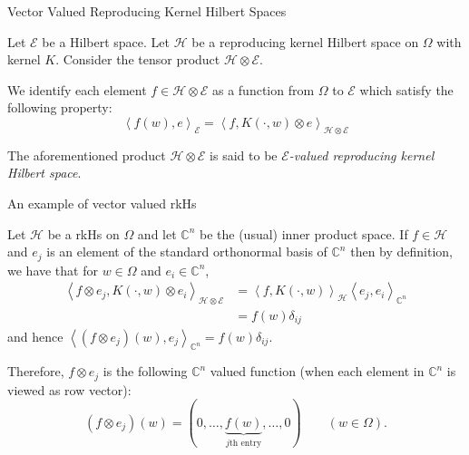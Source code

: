 \documentclass{beamer}
\newcommand{\C}{\mathbb C}
\newcommand{\calE}{{\mathcal E}}
\newcommand{\calH}{{\mathcal H}}
\newcommand{\ip}[1]{\left\langle #1 \right\rangle}
\begin{document}

\begin{frame}{Vector Valued Reproducing Kernel Hilbert Spaces}
\begin{definition}
Let $\calE$ be a Hilbert space. Let $\calH$ be a reproducing kernel Hilbert space on $\Omega$ with kernel $K$. Consider the tensor product $\calH \otimes \calE$.
\pause

We identify each element $f\in \calH \otimes \calE$ as a function from $\Omega$ to $\calE$ which satisfy the following property:
\begin{equation*}
\ip{f(w), e}_{\calE} = \ip{f, K(\cdot, w) \otimes e}_{\calH \otimes \calE}
\end{equation*}
\pause

The aforementioned product $\calH \otimes \calE$ is said to be \textit{$\calE$-valued reproducing kernel Hilbert space}.
\end{definition}

\end{frame}

\begin{frame}{An example of vector valued rkHs}

Let $\calH$ be a rkHs on $\Omega$ and let $\C ^{n}$ be the (usual) inner product space.
\pause
If $f \in \calH$ and $e_{j}$ is an element of the standard orthonormal basis of $\C^{n}$ then by definition, we have that for $w \in \Omega$ and $e_{i} \in \C^{n}$,
\begin{align*}
\ip{f \otimes e_{j}, K\left( \cdot , w \right) \otimes e_{i}}_{\calH \otimes \calE} &= \ip{f, K\left( \cdot , w \right)}_{\calH} \ip{e_{j}, e_{i}}_{\C ^{n}} \\
&= f(w) \delta_{ij}
\end{align*}
and hence $\ip{(f\otimes e_{j})(w), e_{j}}_{\C ^{n}} = f(w)\delta_{ij}$. \pause 


Therefore, $f\otimes e_{j}$ is the following $\C^{n}$ valued function (when each element in $\C ^{n}$ is viewed as row vector):
\begin{equation*}
    \left( f\otimes e_{j} \right)\left( w \right) = \left( 0, \ldots , \underbrace{f\left( w \right)}_{j\text{th entry}}, \ldots , 0 \right) \qquad \left( w \in \Omega \right).
\end{equation*}
\end{frame}
\end{document}
